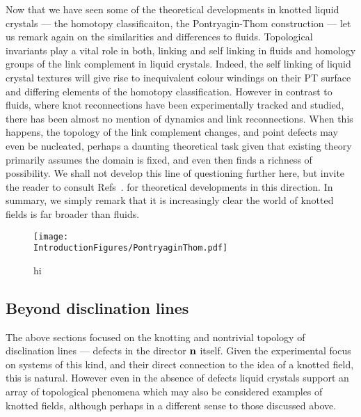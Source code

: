 Now that we have seen some of the theoretical developments in knotted liquid crystals --- the homotopy classificaiton, the Pontryagin-Thom construction --- let us remark again on the similarities and differences to fluids. Topological invariants play a vital role in both, linking and self linking in fluids and homology groups of the link complement in liquid crystals. Indeed, the self linking of liquid crystal textures will give rise to inequivalent colour windings on their PT surface and differing elements of the homotopy classification. However in contrast to fluids, where knot reconnections have been experimentally tracked and studied, there has been almost no mention of dynamics and link reconnections. When this happens, the topology of the link complement changes, and point defects may even be nucleated, perhaps a daunting theoretical task given that existing theory primarily assumes the domain is fixed, and even then finds a richness of possibility. We shall not develop this line of questioning further here, but invite the reader to consult Refs~. for theoretical developments in this direction. In summary, we simply remark that it is increasingly clear the world of knotted fields is far broader than fluids.

\begin{figure}[htbp]
\centering
\texttt{[image: \\IntroductionFigures/PontryaginThom.pdf]}
\caption{hi }
\label{fig:PT}
\end{figure}
\subsection{Beyond disclination lines}
The above sections focused on the knotting and nontrivial topology of disclination lines --- defects in the director $\bf n$ itself. Given the experimental focus on systems of this kind, and their direct connection to the idea of a knotted field, this is natural. However even in the absence of defects liquid crystals support an array of topological phenomena which may also be considered examples of knotted fields, although perhaps in a different sense to those discussed above. 

